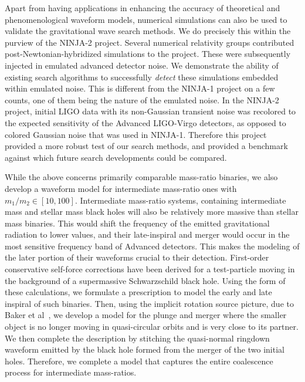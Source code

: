 Apart from having applications in enhancing the accuracy of theoretical 
and phenomenological waveform models, numerical simulations can also be used
to validate the gravitational wave search methods. We do precisely this within
the purview of the NINJA-2 project. Several numerical relativity groups contributed
post-Newtonian-hybridized simulations to the project. These were subsequently
injected in emulated advanced detector noise. We demonstrate the ability of
existing search algorithms to successfully {\it detect} these simulations
embedded within emulated noise. This is different from the NINJA-1 project
on a few counts, one of them being the nature of the emulated noise. In the 
NINJA-2 project, initial LIGO data with its non-Gaussian transient noise was
recolored to the expected sensitivity of the Advanced LIGO-Virgo detectors, as
opposed to colored Gaussian noise that was used in NINJA-1. 
Therefore this project provided a more robust test of our search methods, and 
provided a benchmark against which future search developments could be compared.


While the above concerns primarily comparable mass-ratio binaries, we 
also develop a waveform model for intermediate mass-ratio ones with 
$m_1/m_2 \in [10, 100]$. 
Intermediate mass-ratio systems, containing intermediate mass and stellar
mass black holes will also be relatively more massive than stellar mass binaries.
This would shift the frequency of the emitted gravitational radiation to 
lower values, and their late-inspiral and merger would occur in the most
sensitive frequency band of Advanced detectors. This makes the modeling 
of the later portion of their waveforms crucial to their detection. 
%
First-order conservative self-force corrections have been derived for a
test-particle moving in the background of a supermassive Schwarzschild 
black hole. Using the form of these calculations, we formulate a 
prescription to model the early and late inspiral
of such binaries. Then, using the implicit rotation source picture,
due to Baker et al~\cite{Baker:2008}, we develop a model for the plunge and merger
where the smaller object is no longer moving in quasi-circular orbits
and is very close to its partner. We then complete the description 
by stitching the quasi-normal ringdown waveform emitted by the black hole formed from 
the merger of the two initial holes. Therefore, we complete a model that
captures the entire coalescence process for intermediate mass-ratios.

